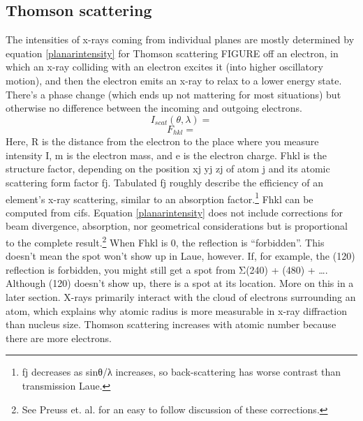 \subsection{Thomson scattering}
The intensities of x-rays coming from individual planes are mostly determined by equation \ref{planarintensity} for Thomson scattering FIGURE off an electron, in which an x-ray colliding with an electron excites it (into higher oscillatory motion), and then the electron emits an x-ray to relax to a lower energy state. There’s a phase change (which ends up not mattering for most situations) but otherwise no difference between the incoming and outgoing electrons. 
\begin{equation}
    I_{scat}(\theta,\lambda)=
    \label{planarintensity}
\end{equation}
\begin{equation}
    F_{hkl}=
    \label{Fhkl}
\end{equation}
Here, R is the distance from the electron to the place where you measure intensity I, m is the electron mass, and e is the electron charge. Fhkl is the structure factor, depending on the position xj yj zj of atom j and its atomic scattering form factor fj. Tabulated fj roughly describe the efficiency of an element’s x-ray scattering, similar to an absorption factor.\footnote{fj decreases as sinθ/λ increases, so back-scattering has worse contrast than transmission Laue.} Fhkl can be computed from cifs. Equation \ref{planarintensity} does not include corrections for beam divergence, absorption, nor geometrical considerations but is proportional to the complete result.\footnote{See Preuss et. al. for an easy to follow discussion of these corrections.}
When Fhkl is 0, the reflection is “forbidden”. This doesn’t mean the spot won’t show up in Laue, however. If, for example, the (120) reflection is forbidden, you might still get a spot from  Σ(240) + (480) + …. Although (120) doesn’t show up, there is a spot at its location. More on this in a later section.
X-rays primarily interact with the cloud of electrons surrounding an atom, which explains why atomic radius is more measurable in x-ray diffraction than nucleus size. Thomson scattering increases with atomic number because there are more electrons.
